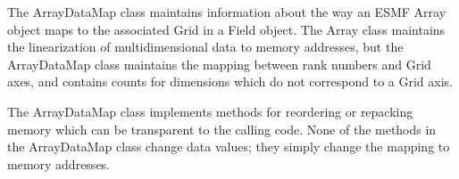 

The ArrayDataMap class maintains information about the way an ESMF Array
object maps to the associated Grid in a Field object.  The Array class
maintains the linearization of multidimensional data to memory addresses,
but the ArrayDataMap class maintains the mapping between rank numbers and
Grid axes, and contains counts for dimensions which do not correspond
to a Grid axis.

The ArrayDataMap class implements methods for reordering or repacking
memory which can be transparent to the calling code.  None of the
methods in the ArrayDataMap class change data values; they simply
change the mapping to memory addresses.




